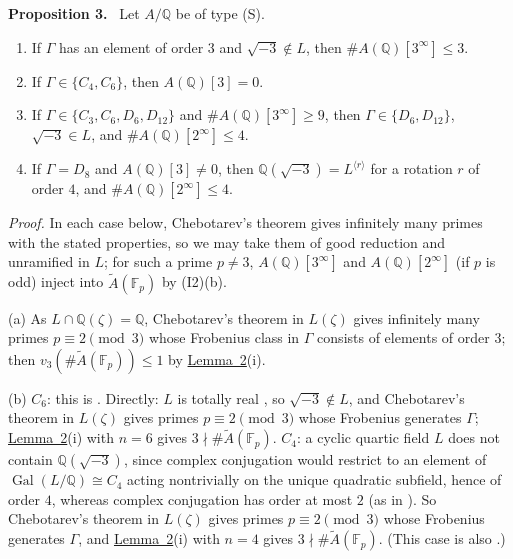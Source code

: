 \documentclass[11pt]{article}
\newenvironment{statement}[1]{\par\medskip\noindent\phantomsection\textbf{#1}\ }{\par\medskip}
\newcommand{\Q}{\mathbb Q}
\newcommand{\F}{\mathbb F}
\DeclareMathOperator{\Gal}{Gal}
\begin{document}
\begin{statement}{Proposition 3.}\label{prop-ord3}
Let \(A/\Q\) be of type (S).
\begin{enumerate}
\item[(a)] If \(\Gamma\) has an element of order \(3\) and \(\sqrt{-3}\notin L\), then \(\#A(\Q)[3^\infty]\le3\).
\item[(b)] If \(\Gamma\in\{C_4,C_6\}\), then \(A(\Q)[3]=0\).
\item[(c)] If \(\Gamma\in\{C_3,C_6,D_6,D_{12}\}\) and \(\#A(\Q)[3^\infty]\ge9\), then \(\Gamma\in\{D_6,D_{12}\}\),
\(\sqrt{-3}\in L\), and \(\#A(\Q)[2^\infty]\le4\).
\item[(d)] If \(\Gamma=D_8\) and \(A(\Q)[3]\neq0\), then \(\Q(\sqrt{-3})=L^{\langle r\rangle}\) for a rotation \(r\)
of order \(4\), and \(\#A(\Q)[2^\infty]\le4\).
\end{enumerate}
\end{statement}

\emph{Proof.} In each case below, Chebotarev's theorem gives infinitely many primes with the stated properties,
so we may take them of good reduction and unramified in \(L\); for such a prime \(p\ne3\), \(A(\Q)[3^\infty]\)
and \(A(\Q)[2^\infty]\) (if \(p\) is odd) inject into \(\widetilde A(\F_p)\) by (I2)(b).

(a) As \(L\cap\Q(\zeta)=\Q\), Chebotarev's theorem in \(L(\zeta)\) gives infinitely many primes
\(p\equiv2\pmod3\) whose Frobenius class in \(\Gamma\) consists of elements of order \(3\); then
\(v_3(\#\widetilde A(\F_p))\le1\) by \hyperref[lemma-shapes]{Lemma~2}(i).

(b) \(C_6\): this is \cite[Lemma~9]{P63}. Directly: \(L\) is totally real \cite[Section~9.1]{P63}, so
\(\sqrt{-3}\notin L\), and Chebotarev's theorem in \(L(\zeta)\) gives primes \(p\equiv2\pmod3\) whose Frobenius
generates \(\Gamma\); \hyperref[lemma-shapes]{Lemma~2}(i) with \(n=6\) gives \(3\nmid\#\widetilde A(\F_p)\).
\(C_4\): a cyclic quartic field \(L\) does not contain \(\Q(\sqrt{-3})\), since complex conjugation would restrict
to an element of \(\Gal(L/\Q)\cong C_4\) acting nontrivially on the unique quadratic subfield, hence of order
\(4\), whereas complex conjugation has order at most \(2\) (as in \cite[proof of Proposition~A, case~(v)]{P45}).
So Chebotarev's theorem in \(L(\zeta)\) gives primes \(p\equiv2\pmod3\) whose Frobenius generates \(\Gamma\), and
\hyperref[lemma-shapes]{Lemma~2}(i) with \(n=4\) gives \(3\nmid\#\widetilde A(\F_p)\). (This case is also
\cite[proof of Proposition~A, case~(v)]{P45}.)
\end{document}
